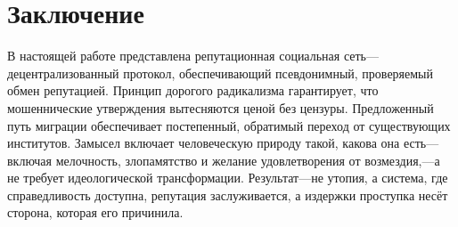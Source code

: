 \documentclass[11pt,a4paper,twocolumn]{article}
\begin{document}
\section{Заключение}

В настоящей работе представлена репутационная социальная сеть---децентрализованный протокол, обеспечивающий псевдонимный, проверяемый обмен репутацией. Принцип дорогого радикализма гарантирует, что мошеннические утверждения вытесняются ценой без цензуры. Предложенный путь миграции обеспечивает постепенный, обратимый переход от существующих институтов. Замысел включает человеческую природу такой, какова она есть---включая мелочность, злопамятство и желание удовлетворения от возмездия,---а не требует идеологической трансформации. Результат---не утопия, а система, где справедливость доступна, репутация заслуживается, а издержки проступка несёт сторона, которая его причинила.


\end{document}
